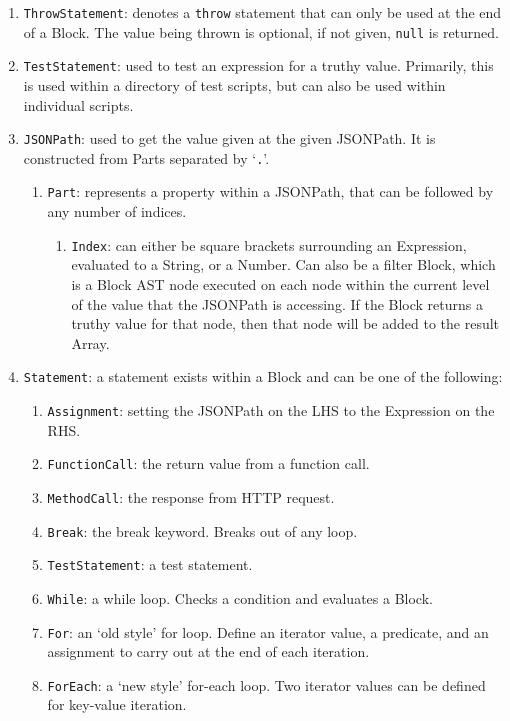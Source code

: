 \begin{enumerate}
    \item \verb|ThrowStatement|: denotes a \verb|throw| statement that can only be used at the end of a Block. The value being thrown is optional, if not given, \verb|null| is returned.
    \item \verb|TestStatement|: used to test an expression for a truthy value. Primarily, this is used within a directory of test scripts, but can also be used within individual scripts.
    \item \verb|JSONPath|: used to get the value given at the given JSONPath. It is constructed from Parts separated by `\verb|.|'.
    \begin{enumerate}
        \item \verb|Part|: represents a property within a JSONPath, that can be followed by any number of indices.
        \begin{enumerate}
            \item \verb|Index|: can either be square brackets surrounding an Expression, evaluated to a String, or a Number. Can also be a filter Block, which is a Block AST node executed on each node within the current level of the value that the JSONPath is accessing. If the Block returns a truthy value for that node, then that node will be added to the result Array.
        \end{enumerate}
    \end{enumerate}
    \item \verb|Statement|: a statement exists within a Block and can be one of the following:
    \begin{enumerate}
        \item \verb|Assignment|: setting the JSONPath on the LHS to the Expression on the RHS.
        \item \verb|FunctionCall|: the return value from a function call.
        \item \verb|MethodCall|: the response from HTTP request.
        \item \verb|Break|: the break keyword. Breaks out of any loop.
        \item \verb|TestStatement|: a test statement.
        \item \verb|While|: a while loop. Checks a condition and evaluates a Block.
        \item \verb|For|: an `old style' for loop. Define an iterator value, a predicate, and an assignment to carry out at the end of each iteration.
        \item \verb|ForEach|: a `new style' for-each loop. Two iterator values can be defined for key-value iteration.

\end{enumerate}
\end{enumerate}
